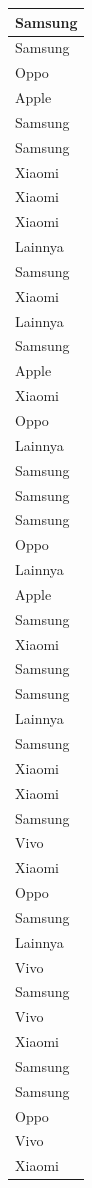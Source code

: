 \documentclass[
  letterpaper,
  DIV=11,
  numbers=noendperiod]{scrartcl}
\begin{document}
\begin{table}
\begin{tabular}[t]{l}
\hline
Samsung\\
\hline
Samsung\\
\hline
Oppo\\
\hline
Apple\\
\hline
Samsung\\
\hline
Samsung\\
\hline
Xiaomi\\
\hline
Xiaomi\\
\hline
Xiaomi\\
\hline
Lainnya\\
\hline
Samsung\\
\hline
Xiaomi\\
\hline
Lainnya\\
\hline
Samsung\\
\hline
Apple\\
\hline
Xiaomi\\
\hline
Oppo\\
\hline
Lainnya\\
\hline
Samsung\\
\hline
Samsung\\
\hline
Samsung\\
\hline
Oppo\\
\hline
Lainnya\\
\hline
Apple\\
\hline
Samsung\\
\hline
Xiaomi\\
\hline
Samsung\\
\hline
Samsung\\
\hline
Lainnya\\
\hline
Samsung\\
\hline
Xiaomi\\
\hline
Xiaomi\\
\hline
Samsung\\
\hline
Vivo\\
\hline
Xiaomi\\
\hline
Oppo\\
\hline
Samsung\\
\hline
Lainnya\\
\hline
Vivo\\
\hline
Samsung\\
\hline
Vivo\\
\hline
Xiaomi\\
\hline
Samsung\\
\hline
Samsung\\
\hline
Oppo\\
\hline
Vivo\\
\hline
Xiaomi\\

\end{tabular}
\end{table}
\end{document}

